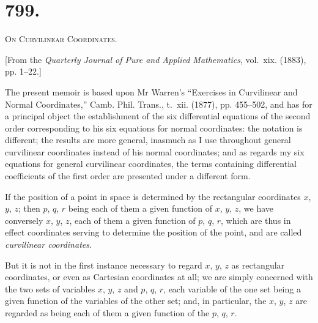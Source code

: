 \documentclass[11pt,a4paper]{book}
\begin{document}
\section*{799.}
\begin{center}
{\large\scshape On Curvilinear Coordinates.}
\end{center}

\begin{flushright}
\small[From the \textit{Quarterly Journal of Pure and Applied Mathematics}, vol.~xix. (1883),\\
pp. 1--22.]
\end{flushright}

The present memoir is based upon Mr Warren's ``Exercises in Curvilinear and Normal Coordinates,'' Camb. Phil. Trans., t.~xii. (1877), pp. 455--502, and has for a principal object the establishment of the six differential equations of the second order corresponding to his six equations for normal coordinates: the notation is different; the results are more general, inasmuch as I use throughout general curvilinear coordinates instead of his normal coordinates; and as regards my six equations for general curvilinear coordinates, the terms containing differential coefficients of the first order are presented under a different form.

If the position of a point in space is determined by the rectangular coordinates $x$, $y$, $z$; then $p$, $q$, $r$ being each of them a given function of $x$, $y$, $z$, we have conversely $x$, $y$, $z$, each of them a given function of $p$, $q$, $r$, which are thus in effect coordinates serving to determine the position of the point, and are called \textit{curvilinear coordinates}.

But it is not in the first instance necessary to regard $x$, $y$, $z$ as rectangular coordinates, or even as Cartesian coordinates at all; we are simply concerned with the two sets of variables $x$, $y$, $z$ and $p$, $q$, $r$, each variable of the one set being a given function of the variables of the other set; and, in particular, the $x$, $y$, $z$ are regarded as being each of them a given function of the $p$, $q$, $r$.
\end{document}
